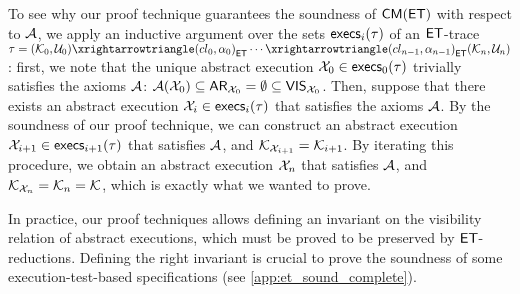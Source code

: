 To see why our proof technique guarantees the soundness of $\CMs(\ET)$ with respect 
to $\mathcal{A}$, we apply an inductive argument over the sets $\execs_{i}(\tau)$ of an $\mathsf{ET}$-trace $\tau = 
(\mkvs_{0}, \vienv_{0})  \toET{(\cl_{0}, \alpha_{0})} \cdots  \toET{(\cl_{n-1}, \alpha_{n-1})} (\mkvs_{n}, \vienv_{n})$: 
first, we note that the unique abstract execution $\aexec_{0} \in \execs_{0}(\tau)$ trivially satisfies the axioms
$\mathcal{A}$: $\mathcal{A}(\mathcal{X}_{0}) \subseteq \mathsf{AR}_{\mathcal{X}_{0}} = \emptyset \subseteq \mathsf{VIS}_{\mathcal{X}_{0}}$. 
Then, suppose that there exists an abstract execution $\aexec_{i} \in \execs_{i}(\tau)$ that satisfies 
the axioms $\mathcal{A}$. By the soundness of our proof technique, we can construct an abstract execution 
$\aexec_{i+1} \in \execs_{i+1}(\tau)$ that satisfies $\mathcal{A}$, and $\mathcal{K}_{\mathcal{X}_{i+1}} = \mathcal{K}_{i+1}$. 
By iterating this procedure, we obtain an abstract execution $\mathcal{X}_{n}$  that satisfies $\mathcal{A}$, and $\mathcal{K}_{\mathcal{X}_{n}} = \mathcal{K}_{n} = \mathcal{K}$, 
which is exactly what we wanted to prove.
%

In practice, our proof techniques allows defining an invariant 
on the visibility relation of abstract executions, which must be proved to be preserved by $\mathsf{ET}$-reductions. %
Defining the right invariant 
is crucial to prove the soundness of some execution-test-based specifications (see \cref{app:et_sound_complete}).

